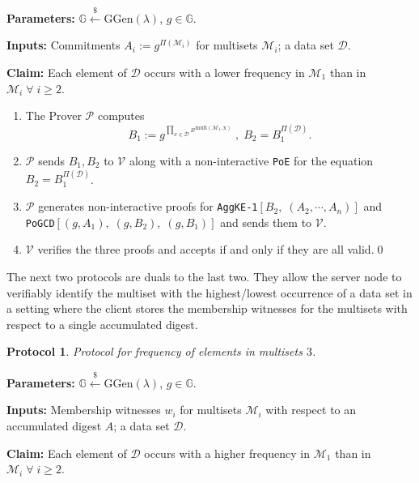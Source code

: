 \documentclass[11pt, lettersize, notitlepage, leqno, footskip=0.6cm]{article}
\newcommand{\pl}{\prod\limits}
\newcommand{\mc}{\mathcal}
\newcommand{\mb}{\mathbb}
\newcommand{\mr}{\mathrm}
\newcommand{\lamb}{\lambda}
\newcommand{\mP}{\mc{P}}
\newcommand{\V}{\mc{V}}
\newcommand{\vs}{\vspace{-0.15cm}}
\newcommand{\noin}{\noindent}
\newtheorem{Prot}[Thm]{Protocol}
\numberwithin{equation}{section}
\begin{document}
\noin \textbf{Parameters:} $\mb{G}\xleftarrow{\$} \mr{GGen}(\lamb)$,\; $g\in \mb{G}$.

\noin \textbf{Inputs:} Commitments $A_i := g^{\Pi(\mc{M}_i)}$ for multisets $\mc{M}_i$; a data set $\mc{D}$.

\noin \textbf{Claim:} Each element of $\mc{D}$ occurs with a lower frequency in $\mc{M}_1$ than in $\mc{M}_i\;\forall\;i\geq 2$. \vs

\begin{enumerate}[wide, labelwidth=!, labelindent=0pt] \vs

\item The Prover $\mP$ computes \vs $$B_1:= g^{\pl_{x\in\mc{D}} x^{\mr{mult(\mc{M}_1, x)}}}\;,\; B_2 = B_1^{\Pi(\mc{D})}.$$ \vspace{-0.8cm}

\item $\mP$ sends $B_1, B_2$ to $\V$ along with a non-interactive \verb|PoE| for the equation $B_2= B_1^{\Pi(\mc{D})}$. \vs

\item $\mP$ generates non-interactive proofs for \verb|AggKE-1|$[B_2,\;(A_2,\cdots,A_n)]$ and\\ \verb|PoGCD|$[(g, A_1),\;(g, B_2),\;(g,B_1)]$ and sends them to $\V$. \vs

\item $\V$ verifies the three proofs and accepts if and only if they are all valid.\qed\end{enumerate}

\noin The next two protocols are duals to the last two. They allow the server node to verifiably identify the multiset with the highest/lowest occurrence of a data set in a setting where the client stores the membership witnesses for the multisets with respect to a single accumulated digest.

\begin{Prot} Protocol for frequency of elements in multisets $3$.\end{Prot} \vspace{-0.3cm}

\noin \textbf{Parameters:} $\mb{G}\xleftarrow{\$} \mr{GGen}(\lamb)$,\; $g\in \mb{G}$.

\noin \textbf{Inputs:} Membership witnesses $w_i$ for multisets $\mc{M}_i$ with respect to an accumulated digest $A$; a data set $\mc{D}$.

\noin \textbf{Claim:} Each element of $\mc{D}$ occurs with a higher frequency in $\mc{M}_1$ than in $\mc{M}_i\;\forall\;i\geq 2$. \vs
\end{document}

